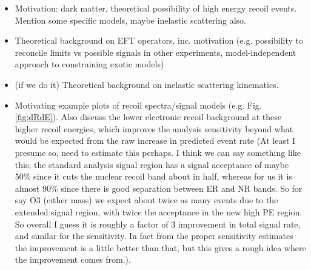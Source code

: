   \begin{itemize}
  \item Motivation: dark matter, theoretical possibility of high energy recoil events. Mention some specific models, maybe inelastic scattering also.
  \item Theoretical background on EFT operators, inc. motivation (e.g. possibility to reconcile limits vs possible signals in other experiments, model-independent approach to constraining exotic models)
  \item (if we do it) Theoretical background on inelastic scattering kinematics.
  \item Motivating example plots of recoil spectra/signal models (e.g. Fig. \ref{fig:dRdE}). Also discuss the lower electronic recoil background at these higher recoil energies, which improves the analysis sensitivity beyond what would be expected from the raw increase in predicted event rate (At least I presume so, need to estimate this perhaps. I think we can say something like this; the standard analysis signal region has a signal acceptance of maybe 50\% since it cuts the nuclear recoil band about in half, whereas for us it is almost 90\% since there is good separation between ER and NR bands. So for say O3 (either mass) we expect about twice as many events due to the extended signal region, with twice the acceptance in the new high PE region. So overall I guess it is roughly a factor of 3 improvement in total signal rate, and similar for the sensitivity. In fact from the proper sensitivity estimates the improvement is a little better than that, but this gives a rough idea where the improvement comes from.).


\end{itemize}
